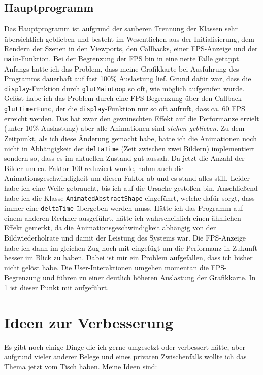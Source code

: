 \documentclass{article}
\let\oldsection\section
\renewcommand\section{\needspace{10\baselineskip}\oldsection}
\let\oldsubsection\subsection
\renewcommand\subsection{\needspace{5\baselineskip}\oldsubsection}
\begin{document}
\subsection{Hauptprogramm}
Das Hauptprogramm ist aufgrund der sauberen Trennung der Klassen sehr übersichtlich geblieben und besteht im Wesentlichen aus der Initialisierung, dem Rendern der Szenen in den Viewports, den Callbacks, einer FPS-Anzeige und der \texttt{main}-Funktion.
Bei der Begrenzung der FPS bin in eine nette Falle getappt.
Anfangs hatte ich das Problem, dass meine Grafikkarte bei Ausführung des Programms dauerhaft auf fast 100\% Auslastung lief.
Grund dafür war, dass die \texttt{display}-Funktion durch \texttt{glutMainLoop} so oft, wie möglich aufgerufen wurde.
Gelöst habe ich das Problem durch eine FPS-Begrenzung über den Callback \texttt{glutTimerFunc}, der die \texttt{display}-Funktion nur so oft aufruft, dass ca. 60 FPS erreicht werden.
Das hat zwar den gewünschten Effekt auf die Performanze erzielt (unter 10\% Auslastung) aber alle Animationen sind \textit{stehen geblieben}.
Zu dem Zeitpunkt, als ich diese Änderung gemacht habe, hatte ich die Animationen noch nicht in Abhängigkeit der \texttt{deltaTime} (Zeit zwischen zwei Bildern) implementiert sondern so, dass es im aktuellen Zustand gut aussah.
Da jetzt die Anzahl der Bilder um ca. Faktor 100 reduziert wurde, nahm auch die Animationsgeschwindigkeit um diesen Faktor ab und es stand alles still.
Leider habe ich eine Weile gebraucht, bis ich auf die Ursache gestoßen bin.
Anschließend habe ich die Klasse \texttt{AnimatedAbstractShape} eingeführt, welche dafür sorgt, dass immer eine \texttt{deltaTime} übergeben werden muss.
Hätte ich das Programm auf einem anderen Rechner ausgeführt, hätte ich wahrscheinlich einen ähnlichen Effekt gemerkt, da die Animationsgeschwindigkeit abhängig von der Bildwiederholrate und damit der Leistung des Systems war.
Die FPS-Anzeige habe ich dann im gleichen Zug noch mit eingefügt um die Performanz in Zukunft besser im Blick zu haben.
Dabei ist mir ein Problem aufgefallen, dass ich bisher nicht gelöst habe. Die User-Interaktionen umgehen momentan die FPS-Begrenzung und führen zu einer deutlich höheren Auslastung der Grafikkarte.
In \ref{sec:improvements} ist dieser Punkt mit aufgeführt.

\clearpage

\section{Ideen zur Verbesserung} \label{sec:improvements}
Es gibt noch einige Dinge die ich gerne umgesetzt oder verbessert hätte, aber aufgrund vieler anderer Belege und eines privaten Zwischenfalls wollte ich das Thema jetzt vom Tisch haben.
Meine Ideen sind:
\end{document}
